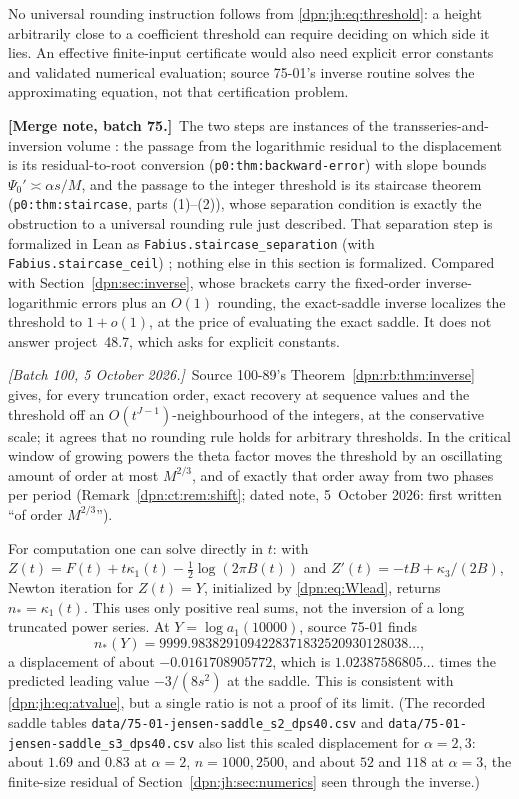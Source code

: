 \documentclass[11pt]{article}
\numberwithin{equation}{section}
\theoremstyle{definition}\newtheorem{definition}[theorem]{Definition}
\theoremstyle{remark}\newtheorem{remark}[theorem]{Remark}
\newcommand{\file}[1]{\nolinkurl{#1}}
\newcommand{\mergenoteb}[1]{\par\smallskip\noindent\textbf{[Merge note, batch 75.]}\ #1\par\smallskip}
\newcommand{\writenoted}[1]{\par\smallskip\noindent\textit{[Batch 100, 5 October 2026.]}\ #1\par\smallskip}
\begin{document}
No universal rounding instruction follows from \eqref{dpn:jh:eq:threshold}: a
height arbitrarily close to a coefficient threshold can require deciding on
which side it lies.  An effective finite-input certificate would also need
explicit error constants and validated numerical evaluation; source 75-01's
inverse routine solves the approximating equation, not that certification
problem.
\mergenoteb{The two steps are instances of the transseries-and-inversion
volume \cite{tai}: the passage from the logarithmic residual to the
displacement is its residual-to-root conversion
(\texttt{p0:thm:backward-error}) with slope bounds
$\Psi_0'\asymp\alpha s/M$, and the passage to the integer threshold is its
staircase theorem (\texttt{p0:thm:staircase}, parts (1)--(2)), whose
separation condition is exactly the obstruction to a universal rounding rule
just described.  That separation step is formalized in Lean as
\texttt{Fabius.staircase\_separation} (with \texttt{Fabius.staircase\_ceil})
\cite{proveitLean}; nothing else in this section is formalized.  Compared with
Section~\ref{dpn:sec:inverse}, whose brackets carry the fixed-order
inverse-logarithmic errors plus an $O(1)$ rounding, the exact-saddle inverse
localizes the threshold to $1+o(1)$, at the price of evaluating the exact
saddle.  It does not answer project~48.7, which asks for explicit constants.}
\writenoted{Source 100-89's Theorem~\ref{dpn:rb:thm:inverse} gives, for every
truncation order, exact recovery at sequence values and the threshold off an
$O(t^{J-1})$-neighbourhood of the integers, at the conservative scale; it
agrees that no rounding rule holds for arbitrary thresholds.  In the critical
window of growing powers the theta factor moves the threshold by an
oscillating amount of order at most $M^{2/3}$, and of exactly that order away
from two phases per period (Remark~\ref{dpn:ct:rem:shift}; dated note,
5~October 2026: first written ``of order $M^{2/3}$'').}

For computation one can solve directly in $t$: with
$Z(t)=F(t)+t\kappa_1(t)-\tfrac12\log(2\pi B(t))$ and
$Z'(t)=-tB+\kappa_3/(2B)$, Newton iteration for $Z(t)=Y$, initialized by
\eqref{dpn:eq:Wlead}, returns $n_*=\kappa_1(t)$.  This uses only positive real
sums, not the inversion of a long truncated power series.  At
$Y=\log a_1(10000)$, source 75-01 finds
\[
 n_*(Y)=9999.9838291094228371832520930128038\ldots,
\]
a displacement of about $-0.0161708905772$, which is $1.02387586805\ldots$
times the predicted leading value $-3/(8s^2)$ at the saddle.  This is
consistent with \eqref{dpn:jh:eq:atvalue}, but a single ratio is not a proof
of its limit.  (The recorded saddle tables
\file{data/75-01-jensen-saddle_s2_dps40.csv} and
\file{data/75-01-jensen-saddle_s3_dps40.csv} also list this scaled displacement for $\alpha=2,3$:
about $1.69$ and $0.83$ at $\alpha=2$, $n=1000,2500$, and about $52$ and $118$
at $\alpha=3$, the finite-size residual of Section~\ref{dpn:jh:sec:numerics}
seen through the inverse.)
\end{document}
